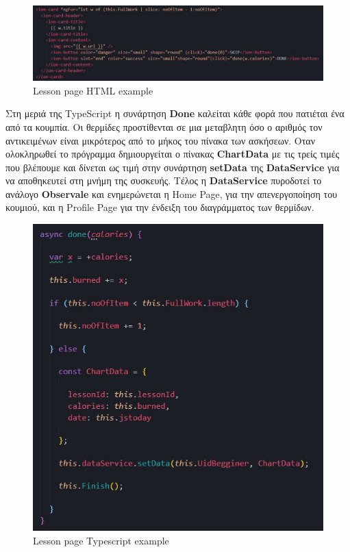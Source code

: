 \documentclass[a4paper,12pt]{article}
\begin{document}
			\begin{figure}[!htb]
					\begin{center}
						\caption{Lesson page HTML example}
						\vspace*{0.5cm}
						\includegraphics[width=.9\linewidth]{doneHtml} 
					\end{center}  	
				\end{figure}

			\newpage
			Στη μεριά της TypeScript η συνάρτηση \textbf{Done} καλείται κάθε φορά που πατιέται ένα από τα κουμπία.
			Οι θερμίδες προστίθενται σε μια μεταβλητη όσο ο αριθμός τον αντικειμένων είναι μικρότερος από το μήκος του
			πίνακα των ασκήσεων. Οταν ολοκληρωθεί το πρόγραμμα δημιουργείται ο πίνακας \textbf{ChartData}
			με τις τρείς τιμές που βλέπουμε και δίνεται ως τιμή στην συνάρτηση \textbf{setData} της \textbf{DataService} για να αποθηκευτεί
			στη μνήμη της συσκευής. Τέλος η \textbf{DataService} πυροδοτεί το ανάλογο \textbf{Observale} και ενημερώνεται η Home Page, για την απενεργοποίηση του κουμιού, και
			η Profile Page για την ένδειξη του διαγράμματος των θερμίδων.
			\vspace{.5cm}

			\begin{figure}[!htb]
				\begin{center}
					\caption{Lesson page Typescript example}
					\vspace*{0.5cm}
					\includegraphics[width=.9\linewidth]{doneTS} 
				\end{center}
			\end{figure}
\end{document}
